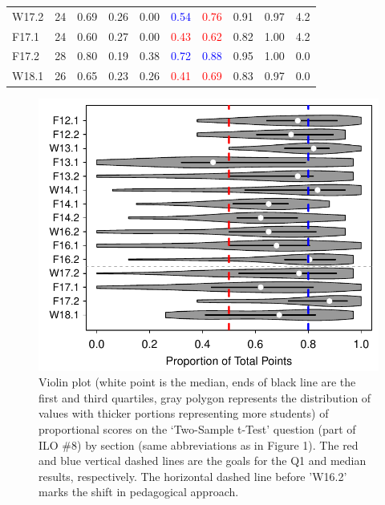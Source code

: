 \documentclass{article}\usepackage[]{graphicx}\usepackage[]{color}
\newenvironment{knitrout}{}{} %
\begin{document}
\begin{table}[h]
\begin{tabular}{lrrrrrrrrr}
  W17.2 & 24 & 0.69 & 0.26 & 0.00 & \textcolor{red}{\textcolor{blue}{0.54}} & \textcolor{red}{                   0.76} & 0.91 & 0.97 & 4.2 \\ 
  F17.1 & 24 & 0.60 & 0.27 & 0.00 & \textcolor{red}{                   0.43} & \textcolor{red}{                   0.62} & 0.82 & 1.00 & 4.2 \\ 
  F17.2 & 28 & 0.80 & 0.19 & 0.38 & \textcolor{red}{\textcolor{blue}{0.72}} & \textcolor{red}{\textcolor{blue}{0.88}} & 0.95 & 1.00 & 0.0 \\ 
  W18.1 & 26 & 0.65 & 0.23 & 0.26 & \textcolor{red}{                   0.41} & \textcolor{red}{                   0.69} & 0.83 & 0.97 & 0.0 \\ 
   \hline
\end{tabular}
\end{table}


\begin{knitrout}
\color{fgcolor}\begin{figure}[h]

{\centering \includegraphics[width=.6\linewidth]{Figs/T2Bar-1} 

}

\caption[Violin plot (white point is the median, ends of black line are the first and third quartiles, gray polygon represents the distribution of values with thicker portions representing more students) of proportional scores on the `Two-Sample t-Test' question (part of ILO \#8) by section (same abbreviations as in Figure 1)]{Violin plot (white point is the median, ends of black line are the first and third quartiles, gray polygon represents the distribution of values with thicker portions representing more students) of proportional scores on the `Two-Sample t-Test' question (part of ILO \#8) by section (same abbreviations as in Figure 1). The red and blue vertical dashed lines are the goals for the Q1 and median results, respectively. The horizontal dashed line before 'W16.2' marks the shift in pedagogical approach.}\label{fig:T2Bar}
\end{figure}


\end{knitrout}
\end{document}
